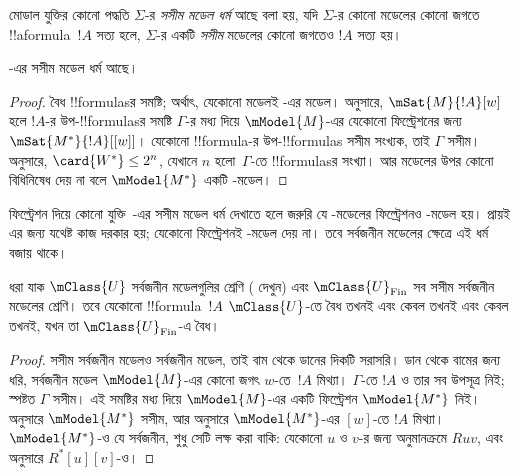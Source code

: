 \documentclass[../../../include/open-logic-section]{subfiles}
\begin{document}


\begin{defn}
  মোডাল যুক্তির কোনো পদ্ধতি $\Sigma$-র \emph{সসীম মডেল ধর্ম} আছে বলা হয়, যদি $\Sigma$-র কোনো মডেলের কোনো জগতে !!a{formula}~$!A$ সত্য হলে, $\Sigma$-র একটি \emph{সসীম} মডেলের কোনো জগতেও $!A$ সত্য হয়।
\end{defn}

\begin{prop}
  -এর সসীম মডেল ধর্ম আছে।
\end{prop}

\begin{proof}
   বৈধ !!{formula}sর সমষ্টি; অর্থাৎ, যেকোনো মডেলই -এর মডেল।  অনুসারে, $\mSat{M}{!A}[w]$ হলে $!A$-র উপ-!!{formula}sর সমষ্টি $\Gamma$-র মধ্য দিয়ে $\mModel{M}$-এর যেকোনো ফিল্ট্রেশনের জন্য $\mSat{M^*}{!A}[{[w]}]$। যেকোনো !!{formula}-র উপ-!!{formula}s সসীম সংখ্যক, তাই $\Gamma$ সসীম।  অনুসারে, $\card{W^*} \le 2^n$, যেখানে $n$ হলো~$\Gamma$-তে !!{formula}sর সংখ্যা। আর  মডেলের উপর কোনো বিধিনিষেধ দেয় না বলে $\mModel{M^*}$ একটি -মডেল।
\end{proof}

ফিল্ট্রেশন দিয়ে কোনো যুক্তি~-এর সসীম মডেল ধর্ম দেখাতে হলে জরুরি যে -মডেলের ফিল্ট্রেশনও -মডেল হয়। প্রায়ই এর জন্য যথেষ্ট কাজ দরকার হয়; যেকোনো ফিল্ট্রেশনই -মডেল দেয় না। তবে সর্বজনীন মডেলের ক্ষেত্রে এই ধর্ম বজায় থাকে।

\begin{prop}
  ধরা যাক $\mClass{U}$ সর্বজনীন মডেলগুলির শ্রেণি ( দেখুন) এবং $\mClass{U}_\mathrm{Fin}$ সব সসীম সর্বজনীন মডেলের শ্রেণি। তবে যেকোনো !!{formula}~$!A$ $\mClass{U}$-তে বৈধ তখনই এবং কেবল তখনই এবং কেবল তখনই, যখন তা $\mClass{U}_\mathrm{Fin}$-এ বৈধ।
\end{prop}

\begin{proof}
  সসীম সর্বজনীন মডেলও সর্বজনীন মডেল, তাই বাম থেকে ডানের দিকটি সরাসরি। ডান থেকে বামের জন্য ধরি, সর্বজনীন মডেল $\mModel{M}$-এর কোনো জগৎ $w$-তে~$!A$ মিথ্যা। $\Gamma$-তে $!A$ ও তার সব উপসূত্র নিই; স্পষ্টত $\Gamma$ সসীম। এই সমষ্টির মধ্য দিয়ে $\mModel{M}$-এর একটি ফিল্ট্রেশন $\mModel{M^*}$ নিই।  অনুসারে $\mModel{M^*}$ সসীম, আর  অনুসারে $\mModel{M^*}$-এর $[w]$-তে $!A$ মিথ্যা। $\mModel{M^*}$-ও যে সর্বজনীন, শুধু সেটি লক্ষ করা বাকি: যেকোনো $u$ ও $v$-র জন্য অনুমানক্রমে $Ruv$, এবং  অনুসারে $R^*[u][v]$-ও।
\end{proof}
\end{document}

